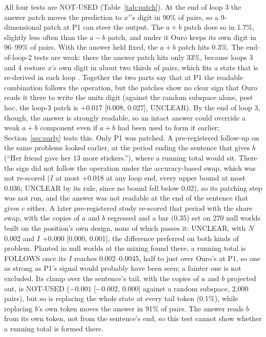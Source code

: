 \documentclass{article}
\begin{document}
All four tests are NOT-USED (Table~\ref{tab:patch}). At the end of loop 3 the answer patch moves the prediction to $x'$'s digit in 90\% of pairs, so a 9-dimensional patch at P1 can steer the output. The $a+b$ patch does so in 1.7\%, slightly less often than the $a-b$ patch, and under it Ouro keeps its own digit in 96--99\% of pairs. With the answer held fixed, the $a+b$ patch hits 0.3\%. The end-of-loop-2 tests are weak: there the answer patch hits only 33\%, because loops 3 and 4 restore $x$'s own digit in about two thirds of pairs, which fits a state that is re-derived in each loop \citep{wangreid2026}. Together the two parts say that at P1 the readable combination follows the operation, but the patches show no clear sign that Ouro reads it there to write the units digit (against the random subspace alone, post hoc, the loop-3 patch is $+0.017$ [0.008, 0.027], UNCLEAR). By the end of loop 3, though, the answer is strongly readable, so an intact answer could override a weak $a+b$ component even if $a+b$ had been used to form it earlier; Section~\ref{sec:early} tests this. Only P1 was patched. A pre-registered follow-up on the same problems looked earlier, at the period ending the sentence that gives $b$ (``Her friend gave her 13 more stickers.''), where a running total would sit. There the sign did not follow the operation under the accuracy-based swap, which was not re-scored ($I$ at most +0.018 at any loop end, every upper bound at most 0.036; UNCLEAR by its rule, since no bound fell below 0.02), so its patching step was not run, and the answer was not readable at the end of the sentence that gives $c$ either. A later pre-registered study re-scored that period with the share swap, with the copies of $a$ and $b$ regressed and a bar (0.35) set on 270 null worlds built on the position's own design, none of which passes it: UNCLEAR, with $N$ 0.002 and $I$ +0.000 [0.000, 0.001], the difference preferred on both kinds of problem. Planted in null worlds at the mixing found there, a running total is FOLLOWS once its $I$ reaches 0.002--0.0045, half to just over Ouro's at P1, so one as strong as P1's signal would probably have been seen; a fainter one is not excluded. Its clamp over the sentence's tail, with the copies of $a$ and $b$ projected out, is NOT-USED ($-0.001$ [$-0.002$, 0.000] against a random subspace, 2,000 pairs), but so is replacing the whole state at every tail token (0.1\%), while replacing $b$'s own token moves the answer in 91\% of pairs. The answer reads $b$ from its own token, not from the sentence's end, so this test cannot show whether a running total is formed there.
\end{document}
